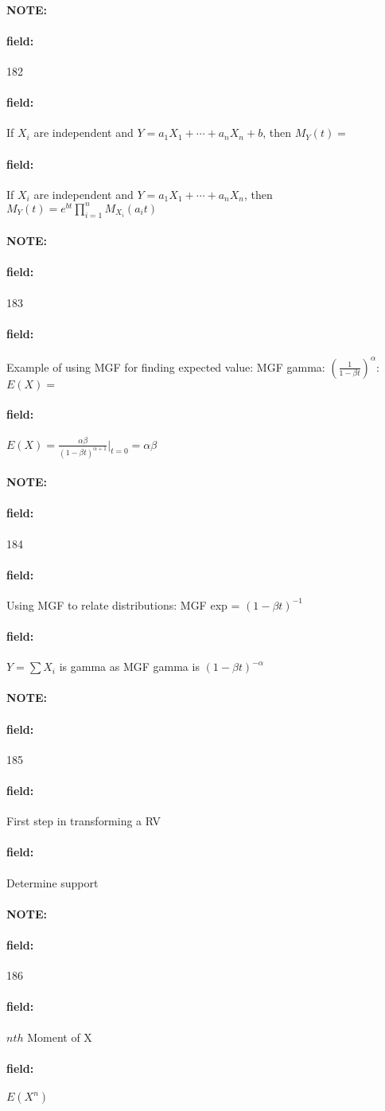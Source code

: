 \documentclass[12pt]{article}
\newenvironment{note}{\paragraph{NOTE:}}{}
\newenvironment{field}{\paragraph{field:}}{}
\begin{document}
\begin{note} \begin{field} \tiny 182 \end{field}
  \begin{field}
    If $X_i$ are independent and $Y = a_1X_1 + \cdots + a_nX_n + b$, then $M_Y(t) = $
  \end{field}
  \begin{field}
    If $X_i$ are independent and $Y = a_1X_1 + \cdots + a_nX_n$, then $M_Y(t) = e^{bt}\prod_{i=1}^n M_{X_i}(a_i t) $
  \end{field}
\end{note}

\begin{note} \begin{field} \tiny 183 \end{field}
  \begin{field}
    Example of using MGF for finding expected value:
    MGF gamma: $(\frac{1}{1 - \beta t})^\alpha$: $E(X) = $
  \end{field}
  \begin{field}
    $E(X) = \frac{\alpha\beta}{(1 - \beta t)^{\alpha+1}}|_{t=0} = \alpha \beta$
  \end{field}
\end{note}

\begin{note} \begin{field} \tiny 184 \end{field}
  \begin{field}
    Using MGF to relate distributions: MGF exp = $( 1 - \beta t)^{-1}$
  \end{field}
  \begin{field}
    $Y = \sum X_i$ is gamma as MGF gamma is $(1 - \beta t)^{-\alpha}$
  \end{field}
\end{note}

\begin{note} \begin{field} \tiny 185 \end{field}
  \begin{field}
    First step in transforming a RV
  \end{field}
  \begin{field}
    Determine support
  \end{field}
\end{note}

\begin{note} \begin{field} \tiny 186 \end{field}
  \begin{field}
    $nth$ Moment of X
  \end{field}
  \begin{field}
    $E(X^n)$
  \end{field}
\end{note}
\end{document}
